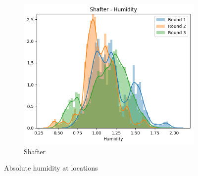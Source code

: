 \documentclass[journal abbreviation, manuscript]{copernicus}
\begin{document}
\begin{figure}[H]
\begin{subfigure}{0.32\textwidth}
\includegraphics[width=\textwidth]{results/distributions/location_shafter_humidity.png}
\caption{Shafter}
\end{subfigure}
\caption{Absolute humidity at locations}
\label{fig:humidity-locations}
\end{figure}

\fi
\end{document}
